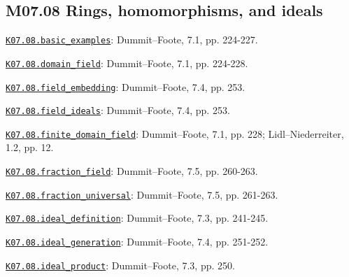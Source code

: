 \subsection*{M07.08 Rings, homomorphisms, and ideals}
\par\smallskip\noindent\hypertarget{src:K07.08.basic_examples}{}\label{src:K07.08.basic_examples}\hyperref[K07.08.basic_examples]{\texttt{K07.08.basic\_examples}}: Dummit--Foote, 7.1, pp. 224-227.
\par\smallskip\noindent\hypertarget{src:K07.08.domain_field}{}\label{src:K07.08.domain_field}\hyperref[K07.08.domain_field]{\texttt{K07.08.domain\_field}}: Dummit--Foote, 7.1, pp. 224-228.
\par\smallskip\noindent\hypertarget{src:K07.08.field_embedding}{}\label{src:K07.08.field_embedding}\hyperref[K07.08.field_embedding]{\texttt{K07.08.field\_embedding}}: Dummit--Foote, 7.4, pp. 253.
\par\smallskip\noindent\hypertarget{src:K07.08.field_ideals}{}\label{src:K07.08.field_ideals}\hyperref[K07.08.field_ideals]{\texttt{K07.08.field\_ideals}}: Dummit--Foote, 7.4, pp. 253.
\par\smallskip\noindent\hypertarget{src:K07.08.finite_domain_field}{}\label{src:K07.08.finite_domain_field}\hyperref[K07.08.finite_domain_field]{\texttt{K07.08.finite\_domain\_field}}: Dummit--Foote, 7.1, pp. 228; Lidl--Niederreiter, 1.2, pp. 12.
\par\smallskip\noindent\hypertarget{src:K07.08.fraction_field}{}\label{src:K07.08.fraction_field}\hyperref[K07.08.fraction_field]{\texttt{K07.08.fraction\_field}}: Dummit--Foote, 7.5, pp. 260-263.
\par\smallskip\noindent\hypertarget{src:K07.08.fraction_universal}{}\label{src:K07.08.fraction_universal}\hyperref[K07.08.fraction_universal]{\texttt{K07.08.fraction\_universal}}: Dummit--Foote, 7.5, pp. 261-263.
\par\smallskip\noindent\hypertarget{src:K07.08.ideal_definition}{}\label{src:K07.08.ideal_definition}\hyperref[K07.08.ideal_definition]{\texttt{K07.08.ideal\_definition}}: Dummit--Foote, 7.3, pp. 241-245.
\par\smallskip\noindent\hypertarget{src:K07.08.ideal_generation}{}\label{src:K07.08.ideal_generation}\hyperref[K07.08.ideal_generation]{\texttt{K07.08.ideal\_generation}}: Dummit--Foote, 7.4, pp. 251-252.
\par\smallskip\noindent\hypertarget{src:K07.08.ideal_product}{}\label{src:K07.08.ideal_product}\hyperref[K07.08.ideal_product]{\texttt{K07.08.ideal\_product}}: Dummit--Foote, 7.3, pp. 250.
